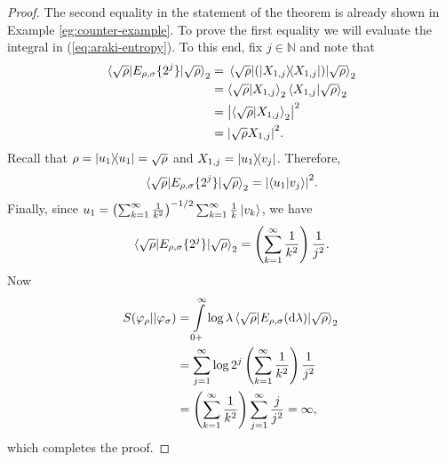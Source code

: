 \documentclass[12pt,a4paper,oneside]{article}
\numberwithin{equation}{section}
\theoremstyle{definition}  %
\theoremstyle{plain}  %
\theoremstyle{remark} %
\newcommand{\BN}{\mathbb{N}}
\let\tr\relax
\DeclareMathOperator{\tr}{Tr}
\begin{document}
 \begin{proof} The second equality in the statement of the theorem is already shown in Example \ref{eg:counter-example}. To prove the first equality we will evaluate the integral in (\ref{eq:araki-entropy}). To this end, fix $j\in \BN$ and note that \begin{align*}
     \mel{\sqrt{\rho}}{E_{\rho,\sigma}\{2^j\}}{\sqrt{\rho}}_{2}&= \mel{\sqrt{\rho}}{\left(\ketbra{X_{1,j}}\right)}{\sqrt{\rho}}_{2}\\
     &=\braket{\sqrt{\rho}}{X_{1,j}}_2\braket{X_{1,j}}{\sqrt{\rho}}_2\\
     &=\abs{\braket{\sqrt{\rho}}{X_{1,j}}_2}^2\\
     &=\abs{\tr {\sqrt{\rho}}{X_{1,j}}}^2.
 \end{align*}
 Recall that $\rho=\ketbra{u_1}=\sqrt{\rho}$ and $X_{1,j}=\ketbra{u_1}{v_j}$. Therefore, \begin{align*}
     \mel{\sqrt{\rho}}{E_{\rho,\sigma}\{2^j\}}{\sqrt{\rho}}_{2} = \abs{\braket{u_1}{v_j}}^2.
 \end{align*}
Finally, since $u_1=\left(\sum_{k=1}^{\infty}\frac{1}{k^2}\right)^{-1/2}\sum_{k=1}^{\infty}\frac{1}{k}\ket{v_k}$, we have \begin{align}\label{eq:measure-araki-entropy}
   \mel{\sqrt{\rho}}{E_{\rho,\sigma}\{2^j\}}{\sqrt{\rho}}_{2} = \left(\sum_{k=1}^{\infty}\frac{1}{k^2}\right) \frac{1}{j^2}.
\end{align}
Now \begin{align*}
    S(\varphi_{\rho}||\varphi_\sigma)&=
 \int\limits_{0+}^{\infty} \log \lambda \mel{\sqrt{\rho}}{E_{\rho,\sigma}(\dd \lambda)}{\sqrt{\rho}}_2\\
 &=\sum_{j=1}^{\infty} \log 2^j\left(\sum_{k=1}^{\infty}\frac{1}{k^2}\right) \frac{1}{j^2}\\
 &=\left(\sum_{k=1}^{\infty}\frac{1}{k^2}\right)\sum_{j=1}^{\infty} \frac{j}{j^2}=\infty,
\end{align*}which completes the proof.
 \end{proof}
\end{document}
